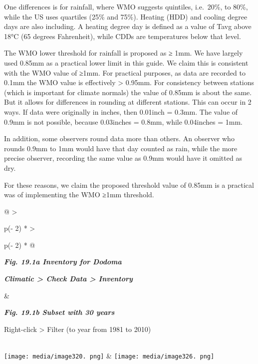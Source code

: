 \documentclass[
  letterpaper,
  DIV=11,
  numbers=noendperiod]{scrreprt}
\begin{document}
One differences is for rainfall, where WMO suggests quintiles,
i.e.~20\%, to 80\%, while the US uses quartiles (25\% and 75\%). Heating
(HDD) and cooling degree days are also including. A heating degree day
is defined as a value of Tavg above 18°C (65 degrees Fahrenheit), while
CDDs are temperatures below that level.

The WMO lower threshold for rainfall is proposed as ≥ 1mm. We have
largely used 0.85mm as a practical lower limit in this guide. We claim
this is consistent with the WMO value of ≥1mm. For practical purposes,
as data are recorded to 0.1mm the WMO value is effectively
\textgreater{} 0.95mm. For consistency between stations (which is
important for climate normals) the value of 0.85mm is about the same.
But it allows for differences in rounding at different stations. This
can occur in 2 ways. If data were originally in inches, then 0.01inch =
0.3mm. The value of 0.9mm is not possible, because 0.03inches = 0.8mm,
while 0.04inches = 1mm.

In addition, some observers round data more than others. An observer who
rounds 0.9mm to 1mm would have that day counted as rain, while the more
precise observer, recording the same value as 0.9mm would have it
omitted as dry.

For these reasons, we claim the proposed threshold value of 0.85mm is a
practical was of implementing the WMO ≥1mm threshold.

\begin{longtable}[]{@{}
  >{\raggedright\arraybackslash}p{(\columnwidth - 2\tabcolsep) * }
  >{\raggedright\arraybackslash}p{(\columnwidth - 2\tabcolsep) * }@{}}
\toprule\noalign{}
\begin{minipage}[b]{\linewidth}\raggedright
\textbf{\emph{Fig. 19.1a Inventory for Dodoma}}

\textbf{\emph{Climatic \textgreater{} Check Data \textgreater{}
Inventory}}
\end{minipage} & \begin{minipage}[b]{\linewidth}\raggedright
\textbf{\emph{Fig. 19.1b Subset with 30 years}}

Right-click \textgreater{} Filter (to year from 1981 to 2010)
\end{minipage} \\
\midrule\noalign{}
\endhead
\bottomrule\noalign{}
\endlastfoot
\texttt{[image: media/image320. png]}
&
\texttt{[image: media/image326. png]} \\
\end{longtable}
\end{document}
